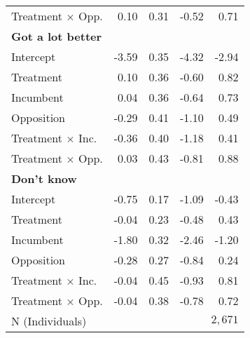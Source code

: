 \begin{table}
\begin{tabular}[t]{l D{.}{.}{-1} D{.}{.}{-1} D{.}{.}{-1} D{.}{.}{-1} }
\textsf{Treatment $\times$ Opp.} & 0.10 & 0.31 & -0.52 & 0.71\\
\textsf{\textbf{Got a lot better}} &  &  &  & \\
\textsf{Intercept} & -3.59 & 0.35 & -4.32 & -2.94\\
\textsf{Treatment} & 0.10 & 0.36 & -0.60 & 0.82\\
\textsf{Incumbent} & 0.04 & 0.36 & -0.64 & 0.73\\
\textsf{Opposition} & -0.29 & 0.41 & -1.10 & 0.49\\
\textsf{Treatment $\times$ Inc.} & -0.36 & 0.40 & -1.18 & 0.41\\
\textsf{Treatment $\times$ Opp.} & 0.03 & 0.43 & -0.81 & 0.88\\
\textsf{\textbf{Don't know}} &  &  &  & \\
\textsf{Intercept} & -0.75 & 0.17 & -1.09 & -0.43\\
\textsf{Treatment} & -0.04 & 0.23 & -0.48 & 0.43\\
\textsf{Incumbent} & -1.80 & 0.32 & -2.46 & -1.20\\
\textsf{Opposition} & -0.28 & 0.27 & -0.84 & 0.24\\
\textsf{Treatment $\times$ Inc.} & -0.04 & 0.45 & -0.93 & 0.81\\
\textsf{Treatment $\times$ Opp.} & -0.04 & 0.38 & -0.78 & 0.72\\
\midrule
\textsf{N (Individuals)} & \\
\bottomrule
\end{tabular}
\end{table}